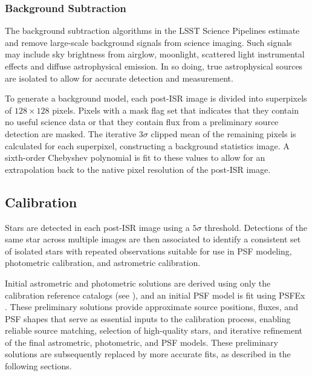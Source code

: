\subsubsection{Background Subtraction}
\label{ssec:background_subtraction}

The background subtraction algorithms in the LSST Science Pipelines estimate and remove large-scale background signals from science imaging.
Such signals may include sky brightness from airglow, moonlight, scattered light instrumental effects and diffuse astrophysical emission.
In so doing, true astrophysical sources are isolated to allow for accurate detection and measurement.

To generate a background model, each post-ISR image is divided into superpixels of $128\times128$ pixels.
Pixels with a mask flag set that indicates that they contain no useful science data or that they contain flux from a preliminary source detection are masked.
The iterative $3\sigma$ clipped mean of the remaining pixels is calculated for each superpixel, constructing a background statistics image.
A sixth-order Chebyshev polynomial is fit to these values to allow for an extrapolation back to the native pixel resolution of the post-ISR image.


\subsection{Calibration}
\label{ssec:drp_calibration}
Stars are detected in each post-ISR image using a $5\sigma$ threshold. 
Detections of the same star across multiple images are then associated to identify a consistent set of isolated stars with repeated observations suitable for use in PSF modeling, photometric calibration, and astrometric calibration.

Initial astrometric and photometric solutions are derived using only the calibration reference catalogs (see ), and an initial PSF model is fit using PSFEx \citep{2011ASPC..442..435B}. 
These preliminary solutions provide approximate source positions, fluxes, and PSF shapes that serve as essential inputs to the calibration process, enabling reliable source matching, selection of high-quality stars, and iterative refinement of the final astrometric, photometric, and PSF models. 
These preliminary solutions are subsequently replaced by more accurate fits, as described in the following sections.

